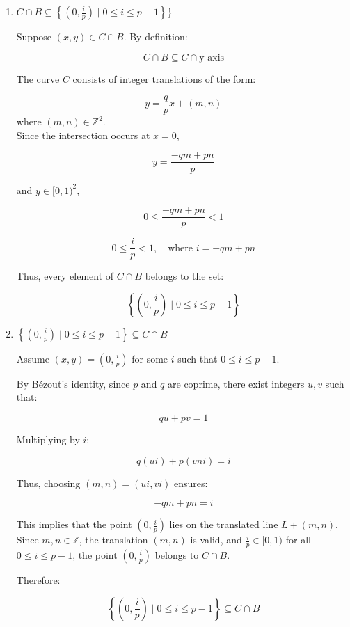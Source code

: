 \documentclass[11pt]{article}
\begin{document}
\begin{enumerate}
\item \(C \cap B \subseteq \left\{ \left(0, \frac{i}{p}\right) \mid 0 \leq i \leq p-1 \right\}\)\}
\label{sec:org131db8b}

Suppose \((x,y) \in C \cap B\). By definition:

\[
C \cap B \subseteq C \cap \text{y-axis}
\]

The curve \(C\) consists of integer translations of the form:

\[
y = \frac{q}{p} x + (m,n)
\]
where \((m,n) \in \mathbb{Z}^2\). \\[0pt]
Since the intersection occurs at \(x = 0\),

\[
y = \frac{-qm + pn}{p}
\]


and \(y \in [0,1)^{2}\), 

\[
0 \leq \frac{-qm + pn}{p} < 1
\]



\[
0 \leq \frac{i}{p} < 1, \quad \text{where } i = -qm + pn
\]

Thus, every element of \(C \cap B\) belongs to the set:

\[
\left\{ \left(0, \frac{i}{p} \right) \mid 0 \leq i \leq p-1 \right\}
\]

\item \(\left\{ \left(0, \frac{i}{p}\right) \mid 0 \leq i \leq p-1 \right\} \subseteq C \cap B\)
\label{sec:org03e999e}

Assume \((x,y) = \left(0, \frac{i}{p}\right)\) for some \(i\) such that \(0 \leq i \leq p-1\).

By Bézout’s identity, since \(p\) and \(q\) are coprime, there exist integers \(u, v\) such that:

\[qu + pv = 1\]

Multiplying by \(i\):

\[q(ui) + p(vni) = i\]

Thus, choosing \((m,n) = (ui, vi)\) ensures:

\[- qm + pn = i\]


This implies that the point \(\left(0, \frac{i}{p}\right)\) lies on the translated line \(L + (m, n)\). Since \(m, n \in \mathbb{Z}\), the translation \((m, n)\) is valid, and \(\frac{i}{p} \in [0, 1)\) for all \(0 \leq i \leq p-1\), the point \(\left(0, \frac{i}{p}\right)\) belongs to \(C \cap B\). 




Therefore:

\[
\left\{ \left(0, \frac{i}{p}\right) \mid 0 \leq i \leq p-1 \right\} \subseteq C \cap B
\]
\end{enumerate}
\end{document}

